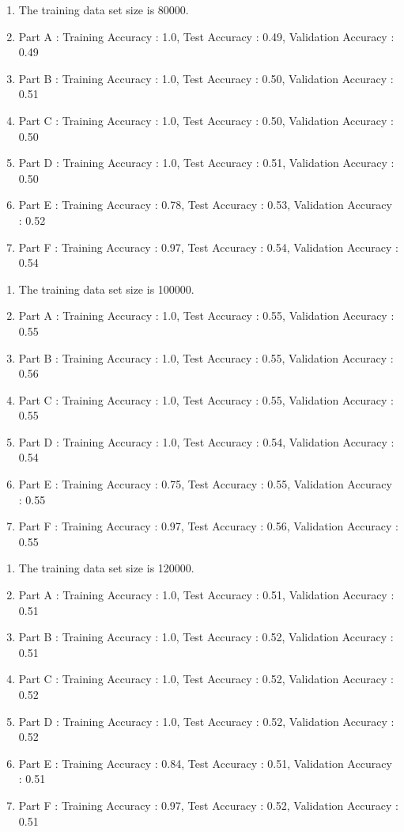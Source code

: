 \documentclass[11pt]{article}
\begin{document}
\hline
\begin{enumerate}
    \item The training data set size is 80000.
    \item Part A : Training Accuracy : 1.0, Test Accuracy : 0.49, Validation Accuracy : 0.49
    \item Part B : Training Accuracy : 1.0, Test Accuracy : 0.50, Validation Accuracy : 0.51
    \item Part C : Training Accuracy : 1.0, Test Accuracy : 0.50, Validation Accuracy : 0.50
    \item Part D : Training Accuracy : 1.0, Test Accuracy : 0.51, Validation Accuracy : 0.50
    \item Part E : Training Accuracy : 0.78, Test Accuracy : 0.53, Validation Accuracy : 0.52
    \item Part F : Training Accuracy : 0.97, Test Accuracy : 0.54, Validation Accuracy : 0.54
\end{enumerate}
\hline
\begin{enumerate}
    \item The training data set size is 100000.
    \item Part A : Training Accuracy : 1.0, Test Accuracy : 0.55, Validation Accuracy : 0.55
    \item Part B : Training Accuracy : 1.0, Test Accuracy : 0.55, Validation Accuracy : 0.56
    \item Part C : Training Accuracy : 1.0, Test Accuracy : 0.55, Validation Accuracy : 0.55
    \item Part D : Training Accuracy : 1.0, Test Accuracy : 0.54, Validation Accuracy : 0.54
    \item Part E : Training Accuracy : 0.75, Test Accuracy : 0.55, Validation Accuracy : 0.55
    \item Part F : Training Accuracy : 0.97, Test Accuracy : 0.56, Validation Accuracy : 0.55
\end{enumerate}
\hline
\begin{enumerate}
    \item The training data set size is 120000.
    \item Part A : Training Accuracy : 1.0, Test Accuracy : 0.51, Validation Accuracy : 0.51
    \item Part B : Training Accuracy : 1.0, Test Accuracy : 0.52, Validation Accuracy : 0.51
    \item Part C : Training Accuracy : 1.0, Test Accuracy : 0.52, Validation Accuracy : 0.52
    \item Part D : Training Accuracy : 1.0, Test Accuracy : 0.52, Validation Accuracy : 0.52
    \item Part E : Training Accuracy : 0.84, Test Accuracy : 0.51, Validation Accuracy : 0.51
    \item Part F : Training Accuracy : 0.97, Test Accuracy : 0.52, Validation Accuracy : 0.51
\end{enumerate}
\end{document}
